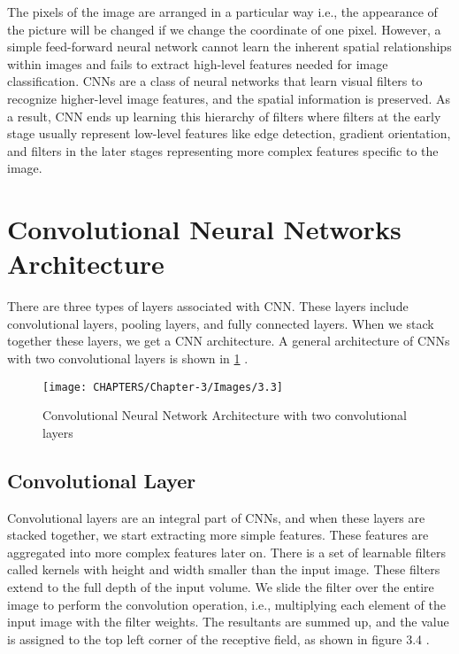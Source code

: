 The pixels of the image are arranged in a particular way i.e., the appearance of the picture will be changed if we change the coordinate of one pixel. However, a simple feed-forward neural network cannot learn the inherent spatial relationships within images and fails to extract high-level features needed for image classification. CNNs are a class
of neural networks that learn visual filters to recognize higher-level image features, and the spatial information is preserved. As a result, CNN ends up learning this hierarchy of filters where filters at the early stage usually represent low-level features like edge detection, gradient orientation, and filters in the later stages representing more complex features specific to the image.

\section{Convolutional Neural Networks Architecture}

There are three types of layers associated with CNN. These layers include convolutional layers, pooling layers, and fully connected layers. When we stack together these layers, we get a CNN architecture. A general
architecture of CNNs with two convolutional layers is shown in \ref{fig:3.3} \cite{chap_3_article:2}.

\begin{figure}[H]
    \centering
        \texttt{[image: CHAPTERS/Chapter-3/Images/3.3]}
    \caption{Convolutional Neural Network Architecture with two convolutional layers}
    \label{fig:3.3}
\end{figure}

\subsection{Convolutional Layer}
Convolutional layers are an integral part of CNNs, and when these layers are stacked
together, we start extracting more simple features. These features are aggregated into more complex features later on. There is a set of learnable filters called kernels with
height and width smaller than the input image. These filters extend to the full depth of the input volume. We slide the filter over the entire image to perform the convolution operation, i.e., multiplying each element of the input image with the filter weights. The resultants are summed up, and the value is assigned to the top left corner of the receptive field, as shown in figure 3.4 \cite{chap_3_article:4}.

